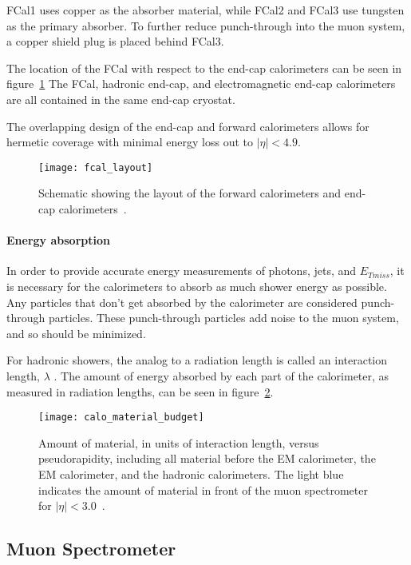 FCal1 uses copper as the absorber material, while FCal2 and FCal3 use tungsten as the primary absorber.
To further reduce punch-through into the muon system, a copper shield plug is placed behind FCal3.

The location of the FCal with respect to the end-cap calorimeters can be seen in figure~\ref{fig:fcal_layout}
The FCal, hadronic end-cap, and electromagnetic end-cap calorimeters are all contained in the same end-cap cryostat.

The overlapping design of the end-cap and forward calorimeters allows for hermetic coverage with minimal energy loss out to $|\eta| < 4.9$.

\begin{figure}[!ht]\centering
\texttt{[image: fcal\_layout]}
\caption{Schematic showing the layout of the forward calorimeters and end-cap calorimeters~\cite{atlas-detector-2008}.}
\label{fig:fcal_layout}
\end{figure}

\paragraph{Energy absorption}
In order to provide accurate energy measurements of photons, jets, and $E_{Tmiss}$,
it is necessary for the calorimeters to absorb as much shower energy as possible.
Any particles that don't get absorbed by the calorimeter are considered punch-through particles.
These punch-through particles add noise to the muon system, and so should be minimized.

For hadronic showers, the analog to a radiation length is called an interaction length, $\lambda$ .
The amount of energy absorbed by each part of the calorimeter, as measured in radiation lengths, can be seen in figure~\ref{fig:calo_material_budget}.

\begin{figure}[!ht]\centering
\texttt{[image: calo\_material\_budget]}
\caption{Amount of material, in units of interaction length, versus pseudorapidity, including all material before the EM calorimeter, the EM calorimeter, and the hadronic calorimeters.
The light blue indicates the amount of material in front of the muon spectrometer for $|\eta| < 3.0$~\cite{atlas-detector-2008}.}
\label{fig:calo_material_budget}
\end{figure}

\subsection{Muon Spectrometer}\label{subsec:muon_spec}

